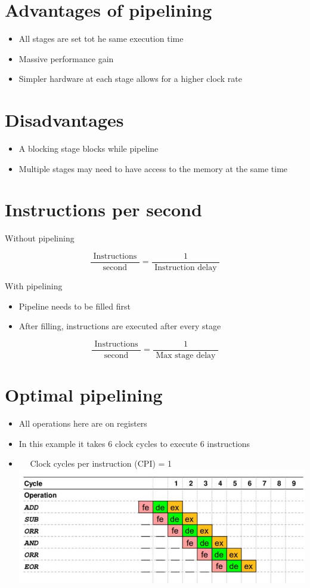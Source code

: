 \documentclass[10pt]{article}
\begin{document}
\section*{Advantages of pipelining}
\begin{itemize}
  \item All stages are set tot he same execution time
  \item Massive performance gain
  \item Simpler hardware at each stage allows for a higher clock rate
\end{itemize}

\section*{Disadvantages}
\begin{itemize}
  \item A blocking stage blocks while pipeline
  \item Multiple stages may need to have access to the memory at the same time
\end{itemize}

\section*{Instructions per second}
Without pipelining

$$
\frac{\text { Instructions }}{\text { second }}=\frac{1}{\text { Instruction delay }}
$$

With pipelining

\begin{itemize}
  \item Pipeline needs to be filled first
  \item After filling, instructions are executed after every stage
\end{itemize}

$$
\frac{\text { Instructions }}{\text { second }}=\frac{1}{\text { Max stage delay }}
$$

\section*{Optimal pipelining}
\begin{itemize}
  \item All operations here are on registers
  \item In this example it takes 6 clock cycles to execute 6 instructions
  \item $\quad$ Clock cycles per instruction (CPI) = 1\\
\includegraphics[max width=\textwidth, center]{2024_12_29_79e6b22f503fb7b4f718g-14}
\end{itemize}
\end{document}
